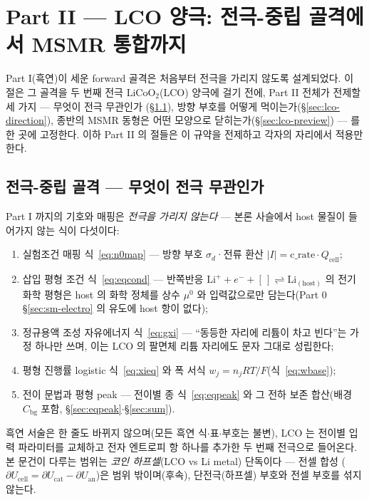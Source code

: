 \documentclass[11pt,a4paper]{article}
\newcommand{\cell}{\mathrm{cell}}
\newcommand{\bg}{\mathrm{bg}}
\begin{document}
\section{Part II --- LCO 양극: 전극-중립 골격에서 MSMR 통합까지}\label{sec:lco-intro}
Part I(흑연)이 세운 forward 골격은 처음부터 전극을 가리지 않도록 설계되었다. 이 절은 그 골격을 두 번째 전극
$\mathrm{LiCoO_2}$(LCO) 양극에 걸기 전에, Part II 전체가 전제할 세 가지 --- 무엇이 전극 무관인가
(\S\ref{sec:lco-map}), 방향 부호를 어떻게 먹이는가(\S\ref{sec:lco-direction}), 종반의 MSMR 동형은 어떤
모양으로 닫히는가(\S\ref{sec:lco-preview}) --- 를 한 곳에 고정한다. 이하 Part II 의 절들은 이 규약을
전제하고 각자의 자리에서 적용만 한다.

\subsection{전극-중립 골격 --- 무엇이 전극 무관인가}\label{sec:lco-map}
Part I 까지의 기호와 매핑은 \emph{전극을 가리지 않는다} --- 본론 사슬에서 host 물질이 들어가지 않는 식이
다섯이다:
\begin{enumerate}[label=(\arabic*),leftmargin=2.2em,itemsep=1pt]
\item 실험조건 매핑 식~\eqref{eq:n0map} --- 방향 부호 $\sigma_d$·전류 환산 $|I|=\text{c\_rate}\cdot Q_\cell$;
\item 삽입 평형 조건 식~\eqref{eq:eqcond} --- 반쪽반응
$\mathrm{Li}^++e^-+[\,]\rightleftharpoons\mathrm{Li}_{(\mathrm{host})}$ 의 전기화학 평형은 host 의 화학
정체를 상수 $\mu^0$ 와 입력값으로만 담는다(Part 0 \S\ref{sec:sm-electro} 의 유도에 host 항이 없다);
\item 정규용액 조성 자유에너지 식~\eqref{eq:gxi} --- ``동등한 자리에 리튬이 차고 빈다''는 가정 하나만 쓰며,
이는 LCO 의 팔면체 리튬 자리에도 문자 그대로 성립한다;
\item 평형 진행률 logistic 식~\eqref{eq:xieq} 와 폭 서식 $w_j=n_jRT/F$(식~\eqref{eq:wbase});
\item 전이 문법과 평형 peak --- 전이별 종 식~\eqref{eq:eqpeak} 와 그 전하 보존 합산(배경 $C_\bg$ 포함,
\S\ref{sec:eqpeak}$\cdot$\S\ref{sec:sum}).
\end{enumerate}
흑연 서술은 한 줄도 바뀌지 않으며(모든 흑연
식$\cdot$표$\cdot$부호는 불변), LCO 는 전이별 입력 파라미터를 교체하고 전자 엔트로피 항 하나를 추가한
두 번째 전극으로 들어온다. 본 문건이 다루는 범위는 \emph{코인 하프셀}(LCO vs Li metal) 단독이다 --- 전셀 합성
($\partial U_\cell=\partial U_\mathrm{cat}-\partial U_\mathrm{an}$)은 범위 밖이며(후속), 단전극(하프셀) 부호와 전셀
부호를 섞지 않는다.
\end{document}
